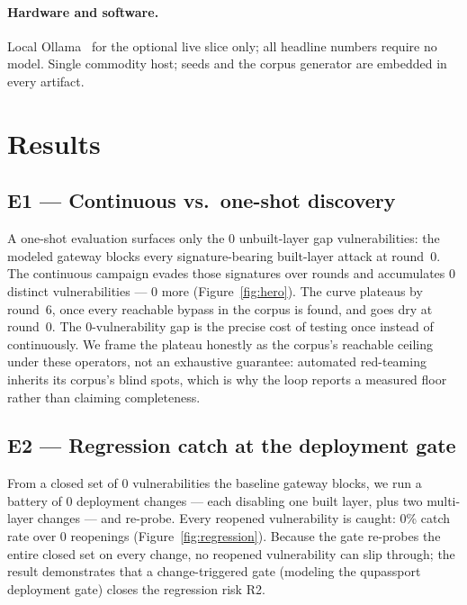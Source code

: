 \documentclass[11pt]{article}
\providecommand{\EoneOneShot}{0}
\providecommand{\EoneContinuous}{0}
\providecommand{\EoneExtra}{0}
\providecommand{\EoneRoundsToDry}{0}
\providecommand{\EtwoCatch}{0\%}
\providecommand{\EtwoReopened}{0}
\providecommand{\EtwoChanges}{0}
\providecommand{\EtwoClosed}{0}
\begin{document}
\paragraph{Hardware and software.} Local Ollama~\cite{ollama} for the optional live
slice only; all headline numbers require no model. Single commodity host; seeds and
the corpus generator are embedded in every artifact.

\section{Results}\label{sec:results}
\subsection{E1 --- Continuous vs.\ one-shot discovery}\label{sec:e1}
A one-shot evaluation surfaces only the \EoneOneShot{} unbuilt-layer gap
vulnerabilities: the modeled gateway blocks every signature-bearing built-layer
attack at round~0. The continuous campaign evades those signatures over rounds and
accumulates \EoneContinuous{} distinct vulnerabilities --- \EoneExtra{} more
(Figure~\ref{fig:hero}). The curve plateaus by round~6, once every reachable bypass
in the corpus is found, and goes dry at round~\EoneRoundsToDry. The
\EoneExtra{}-vulnerability gap is the precise cost of testing once instead of
continuously. We frame the plateau honestly as the corpus's reachable ceiling under
these operators, not an exhaustive guarantee: automated red-teaming inherits its
corpus's blind spots, which is why the loop reports a measured floor rather than
claiming completeness.

\subsection{E2 --- Regression catch at the deployment gate}\label{sec:e2}
From a closed set of \EtwoClosed{} vulnerabilities the baseline gateway blocks, we
run a battery of \EtwoChanges{} deployment changes --- each disabling one built
layer, plus two multi-layer changes --- and re-probe. Every reopened vulnerability is
caught: \EtwoCatch{} catch rate over \EtwoReopened{} reopenings
(Figure~\ref{fig:regression}). Because the gate re-probes the entire closed set on
every change, no reopened vulnerability can slip through; the result demonstrates
that a change-triggered gate (modeling the qupassport deployment gate) closes the regression
risk R2.
\end{document}
